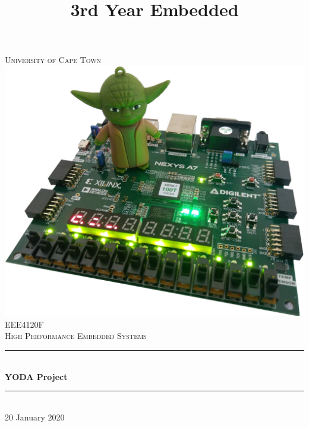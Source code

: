 \title{3rd Year Embedded}

\begin{titlepage}
	\centering
	\vspace*{0.5 cm}
	
	\textsc{\LARGE University of Cape Town}\\[2.0 cm]	%
	\includegraphics[scale = 0.2]{Figures/YODAFPGA.png}\\[1 cm]	%
	\textsc{\Large EEE4120F}\\[0.5 cm]				%
	\textsc{\large High Performance Embedded Systems}\\[0.5 cm]				%
	\rule{\linewidth}{0.2 mm} \\[0.4 cm]
	{ \huge \bfseries YODA Project}\\
	\rule{\linewidth}{0.2 mm} \\
	\vfill
	{\large 20 January 2020}\\[2 cm]
	

	
\end{titlepage}